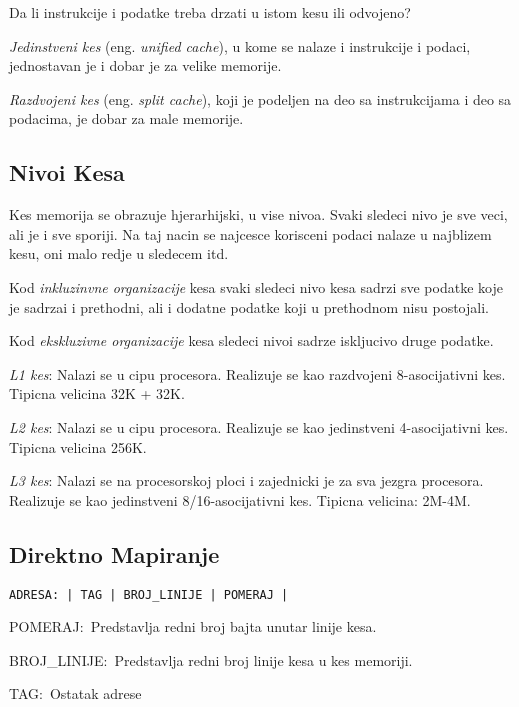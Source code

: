 \documentclass[12p,a4paper]{article}
\begin{document}
\begin{multicols}{2}
    Da li instrukcije i podatke treba drzati u istom kesu ili odvojeno?

    \emph{Jedinstveni kes} (eng. \emph{unified cache}), u kome se nalaze i
    instrukcije i podaci, jednostavan je i dobar je za velike memorije.

    \emph{Razdvojeni kes} (eng. \emph{split cache}), koji je podeljen
    na deo sa instrukcijama i deo sa podacima, je dobar za male memorije.

    \subsection{Nivoi Kesa}
    
    Kes memorija se obrazuje hjerarhijski, u vise nivoa. Svaki sledeci nivo je
    sve veci, ali je i sve sporiji. Na taj nacin se najcesce korisceni podaci 
    nalaze u najblizem kesu, oni malo redje u sledecem itd.
    
    Kod \emph{inkluzinvne organizacije} kesa svaki sledeci nivo kesa sadrzi 
    sve podatke koje je sadrzai i prethodni, ali i dodatne podatke koji u 
    prethodnom nisu postojali.

    Kod \emph{ekskluzivne organizacije} kesa sledeci nivoi sadrze iskljucivo
    druge podatke.

    \emph{L1 kes}: Nalazi se u cipu procesora. 
    Realizuje se kao razdvojeni 8-asocijativni kes.
    Tipicna velicina 32K + 32K.

    \emph{L2 kes}: Nalazi se u cipu procesora.
    Realizuje se kao jedinstveni 4-asocijativni kes.
    Tipicna velicina 256K.

    \emph{L3 kes}: Nalazi se na procesorskoj ploci i zajednicki je za
    sva jezgra procesora.
    Realizuje se kao jedinstveni 8/16-asocijativni kes.
    Tipicna velicina: 2M-4M.

    \subsection{Direktno Mapiranje}

    \begin{lstlisting}
ADRESA: | TAG | BROJ_LINIJE | POMERAJ |
    \end{lstlisting}

    POMERAJ:\ Predstavlja redni broj bajta unutar linije kesa.

    BROJ\_LINIJE:\ Predstavlja redni broj linije kesa u kes memoriji.

    TAG:\ Ostatak adrese


\end{multicols}
\end{document}
